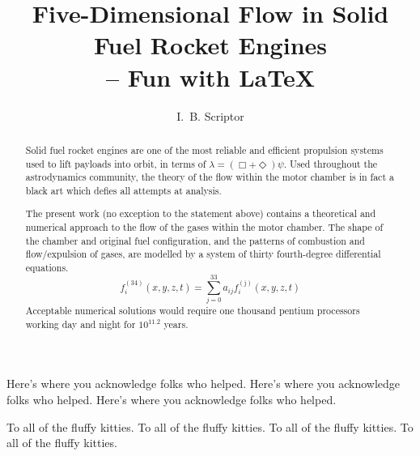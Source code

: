 \documentclass[12pt]{niuthesis}
\begin{document}
\title{Five-Dimensional Flow in Solid\\ Fuel Rocket Engines\\
       -- Fun with \LaTeX}

\author{I.~B. Scriptor}


\begin{abstract}
  Solid fuel rocket engines are one of the most reliable and
  efficient propulsion systems used to lift payloads into orbit, in
  terms of $\lambda=(\Box+\Diamond)\psi$. Used throughout the
  astrodynamics community, the theory of the flow within the motor
  chamber is in fact a black art which defies all attempts at
  analysis.
	
  The present work (no exception to the statement above) contains a
  theoretical and numerical approach to the flow of the gases within
  the motor chamber. The shape of the chamber and original fuel
  configuration, and the patterns of combustion and flow/expulsion
  of gases, are modelled by a system of thirty fourth-degree
  differential equations.
  \begin{displaymath}
    f_i^{(34)}(x,y,z,t) = 
    \sum_{j=0}^{33} a_{ij} f_i^{(\mathrm{j})}(x,y,z,t)
  \end{displaymath}
  Acceptable numerical solutions would require one thousand pentium
  processors working day and night for $10^{11.2}$ years.
\end{abstract}

\begin{acknowledgments}
  Here's where you acknowledge folks who helped.
  Here's where you acknowledge folks who helped.
  Here's where you acknowledge folks who helped.
\end{acknowledgments}

\begin{dedication}
  To all of the fluffy kitties.
  To all of the fluffy kitties.
  To all of the fluffy kitties.
  To all of the fluffy kitties.
\end{dedication}

\MakeThesisPrologue %



\appendix
\end{document}
